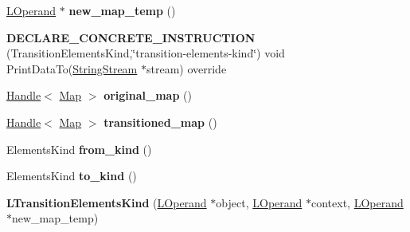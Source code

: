 \begin{DoxyCompactItemize}
\item 
\hyperlink{classv8_1_1internal_1_1_l_operand}{L\+Operand} $\ast$ {\bfseries new\+\_\+map\+\_\+temp} ()\hypertarget{classv8_1_1internal_1_1_l_transition_elements_kind_a4a446ffbd6e39017d357109db06dd661}{}\label{classv8_1_1internal_1_1_l_transition_elements_kind_a4a446ffbd6e39017d357109db06dd661}

\item 
{\bfseries D\+E\+C\+L\+A\+R\+E\+\_\+\+C\+O\+N\+C\+R\+E\+T\+E\+\_\+\+I\+N\+S\+T\+R\+U\+C\+T\+I\+ON} (Transition\+Elements\+Kind,\char`\"{}transition-\/elements-\/kind\char`\"{}) void Print\+Data\+To(\hyperlink{classv8_1_1internal_1_1_string_stream}{String\+Stream} $\ast$stream) override\hypertarget{classv8_1_1internal_1_1_l_transition_elements_kind_ac3d3fcdb1323fb5a8ffe1c35ad9d633e}{}\label{classv8_1_1internal_1_1_l_transition_elements_kind_ac3d3fcdb1323fb5a8ffe1c35ad9d633e}

\item 
\hyperlink{classv8_1_1internal_1_1_handle}{Handle}$<$ \hyperlink{classv8_1_1internal_1_1_map}{Map} $>$ {\bfseries original\+\_\+map} ()\hypertarget{classv8_1_1internal_1_1_l_transition_elements_kind_a1f6534ac0fae8a2a00aacbdb977df2e1}{}\label{classv8_1_1internal_1_1_l_transition_elements_kind_a1f6534ac0fae8a2a00aacbdb977df2e1}

\item 
\hyperlink{classv8_1_1internal_1_1_handle}{Handle}$<$ \hyperlink{classv8_1_1internal_1_1_map}{Map} $>$ {\bfseries transitioned\+\_\+map} ()\hypertarget{classv8_1_1internal_1_1_l_transition_elements_kind_a4ffe4230acac522bfd54c3789ccd213b}{}\label{classv8_1_1internal_1_1_l_transition_elements_kind_a4ffe4230acac522bfd54c3789ccd213b}

\item 
Elements\+Kind {\bfseries from\+\_\+kind} ()\hypertarget{classv8_1_1internal_1_1_l_transition_elements_kind_af634084f5d3f05e0700cc8d35a797465}{}\label{classv8_1_1internal_1_1_l_transition_elements_kind_af634084f5d3f05e0700cc8d35a797465}

\item 
Elements\+Kind {\bfseries to\+\_\+kind} ()\hypertarget{classv8_1_1internal_1_1_l_transition_elements_kind_a131f478caf0a117639ee35cd0bdeed59}{}\label{classv8_1_1internal_1_1_l_transition_elements_kind_a131f478caf0a117639ee35cd0bdeed59}

\item 
{\bfseries L\+Transition\+Elements\+Kind} (\hyperlink{classv8_1_1internal_1_1_l_operand}{L\+Operand} $\ast$object, \hyperlink{classv8_1_1internal_1_1_l_operand}{L\+Operand} $\ast$context, \hyperlink{classv8_1_1internal_1_1_l_operand}{L\+Operand} $\ast$new\+\_\+map\+\_\+temp)\hypertarget{classv8_1_1internal_1_1_l_transition_elements_kind_a6a44fc06b9c2f761c817997ec00269f3}{}\label{classv8_1_1internal_1_1_l_transition_elements_kind_a6a44fc06b9c2f761c817997ec00269f3}


\end{DoxyCompactItemize}
